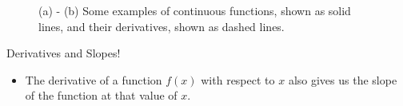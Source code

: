 \documentclass[xcolor={table}]{beamer}
\begin{document}
 \begin{frame} [plain]
\begin{figure}[!htb]
\begin{center}
\caption{(a) - (b) Some examples of continuous functions, shown as solid lines, and their derivatives, shown as dashed lines. }
\label{fig:derivExample}
\end{center}
\end{figure}
\end{frame} 

\begin{frame} 
\begin{alertblock}{Derivatives and Slopes!}
\begin{itemize}
	\item The derivative of a function $f(x)$ with respect to $x$ also gives us the slope of the function at that value of $x$.
\end{itemize}
\end{alertblock}
\end{frame}
\end{document}

